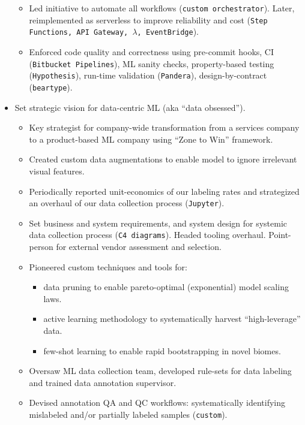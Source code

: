 \documentclass[a4paper,12pt]{article}
\begin{document}
\begin{itemize}
\begin{itemize}
            \item Led initiative to automate all workflows (\texttt{custom orchestrator}). Later, reimplemented as serverless to improve reliability and cost (\texttt{Step Functions, API Gateway, $\lambda$, EventBridge}).
            \item Enforced code quality and correctness using pre-commit hooks, CI (\texttt{Bitbucket Pipelines}), ML sanity checks, property-based testing (\texttt{Hypothesis}), run-time validation (\texttt{Pandera}), design-by-contract (\texttt{beartype}).
        \end{itemize}
        \item Set strategic vision for data-centric ML (aka ``data obsessed'').
        \begin{itemize}
            \item Key strategist for company-wide transformation from a services company to a product-based ML company using ``Zone to Win'' framework.
            \item Created custom data augmentations to enable model to ignore irrelevant visual features.
            \item Periodically reported unit-economics of our labeling rates and strategized an overhaul of our data collection process (\texttt{Jupyter}).
            \item Set business and system requirements, and system design for systemic data collection process (\texttt{C4 diagrams}). Headed tooling overhaul. Point-person for external vendor assessment and selection.
            \item Pioneered custom techniques and tools for:
            \begin{itemize}
                \item data pruning to enable pareto-optimal (exponential) model scaling laws.
                \item active learning methodology to systematically harvest ``high-leverage'' data.
                \item few-shot learning to enable rapid bootstrapping in novel biomes.
            \end{itemize}
            \item Oversaw ML data collection team, developed rule-sets for data labeling and trained data annotation supervisor.
            \item Devised annotation QA and QC workflows: systematically identifying mislabeled and/or partially labeled samples (\texttt{custom}).
        \end{itemize}


    \end{itemize}
\end{document}
